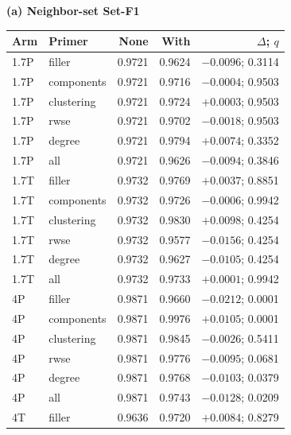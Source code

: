 \begin{table}[t]
\centering
\begin{minipage}[t]{.48\textwidth}
\centering\footnotesize\setlength{\tabcolsep}{2.1pt}
\textbf{(a) Neighbor-set Set-F1}\par\smallskip
\begin{tabular}{llrrr}
\toprule
Arm & Primer & None & With & $\Delta$; $q$\\
\midrule
1.7P & filler & 0.9721 & 0.9624 & $-0.0096$; 0.3114\\ %
1.7P & components & 0.9721 & 0.9716 & $-0.0004$; 0.9503\\ %
1.7P & clustering & 0.9721 & 0.9724 & $+0.0003$; 0.9503\\ %
1.7P & rwse & 0.9721 & 0.9702 & $-0.0018$; 0.9503\\ %
1.7P & degree & 0.9721 & 0.9794 & $+0.0074$; 0.3352\\ %
1.7P & all & 0.9721 & 0.9626 & $-0.0094$; 0.3846\\ %
\addlinespace[2pt]
1.7T & filler & 0.9732 & 0.9769 & $+0.0037$; 0.8851\\ %
1.7T & components & 0.9732 & 0.9726 & $-0.0006$; 0.9942\\ %
1.7T & clustering & 0.9732 & 0.9830 & $+0.0098$; 0.4254\\ %
1.7T & rwse & 0.9732 & 0.9577 & $-0.0156$; 0.4254\\ %
1.7T & degree & 0.9732 & 0.9627 & $-0.0105$; 0.4254\\ %
1.7T & all & 0.9732 & 0.9733 & $+0.0001$; 0.9942\\ %
\addlinespace[2pt]
4P & filler & 0.9871 & 0.9660 & $-0.0212$; 0.0001\\ %
4P & components & 0.9871 & 0.9976 & $+0.0105$; 0.0001\\ %
4P & clustering & 0.9871 & 0.9845 & $-0.0026$; 0.5411\\ %
4P & rwse & 0.9871 & 0.9776 & $-0.0095$; 0.0681\\ %
4P & degree & 0.9871 & 0.9768 & $-0.0103$; 0.0379\\ %
4P & all & 0.9871 & 0.9743 & $-0.0128$; 0.0209\\ %
\addlinespace[2pt]
4T & filler & 0.9636 & 0.9720 & $+0.0084$; 0.8279\\ %

\end{tabular}
\end{minipage}
\end{table}
